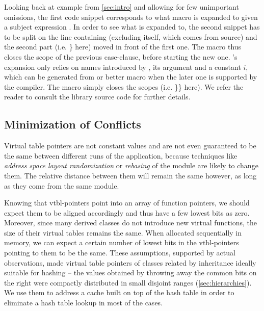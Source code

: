 
Looking back at example from \textsection\ref{sec:intro} and allowing for few 
unimportant omissions, the first code snippet corresponds to what macro 
 is expanded to given a subject expression . In order to 
see what  is expanded to, the second snippet has to be split on 
the line containing  (excluding  itself, which comes from 
source) and the second part (i.e. \} here) moved in front of the first one. The 
macro thus closes the scope of the previous case-clause, before starting the new 
one. 's expansion only relies on names introduced by , 
its argument  and a constant $i$, which can be generated from 
 or better  macro when the later one is 
supported by the compiler. The  macro simply closes the scopes 
(i.e. \}\} here). We refer the reader to consult the library source code for 
further details.


\subsection{Minimization of Conflicts}
\label{sec:moc}

Virtual table pointers are not constant values and are not even guaranteed to be 
the same between different runs of the application, because techniques like 
\emph{address space layout randomization} or \emph{rebasing} of the module are 
likely to change them. The relative distance between them will remain the same 
however, as long as they come from the same module.

Knowing that vtbl-pointers point into an array of function pointers, we should 
expect them to be aligned accordingly and thus have a few lowest bits as zero. 
Moreover, since many derived classes do not introduce new virtual functions, 
the size of their virtual tables remains the same. When allocated sequentially 
in memory, we can expect a certain number of lowest bits in the vtbl-pointers 
pointing to them to be the same.
These assumptions, supported by actual observations, made virtual table 
pointers of classes related by inheritance ideally suitable for hashing -- the 
values obtained by throwing away the common bits on the right were compactly 
distributed in small disjoint ranges (\textsection\ref{sec:hierarchies}). We use 
them to address a cache built on top of the hash table in order to eliminate a 
hash table lookup in most of the cases.


